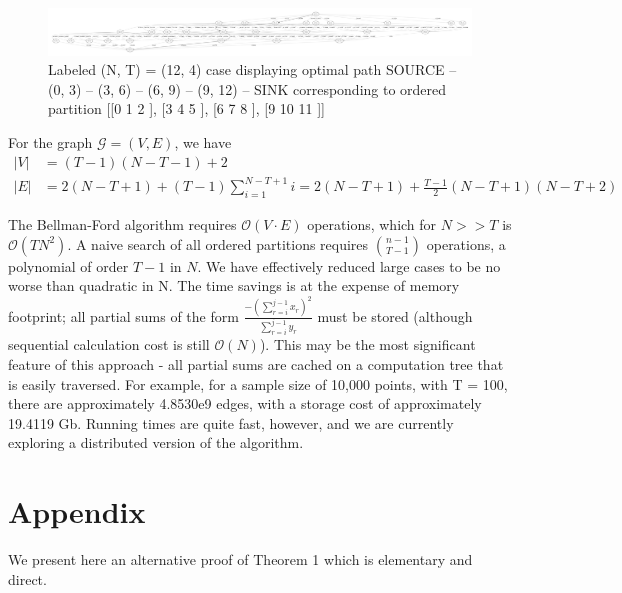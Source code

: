 \documentclass{article}
\theoremstyle{case}
\begin{document}
\vspace{16pt}
\begin{figure}
  \includegraphics[scale=.11]{12_4_labeled.pdf}
  \caption{Labeled (N, T) = (12, 4) case displaying optimal path SOURCE -- (0, 3) -- (3, 6) -- (6, 9) -- (9, 12) --  SINK corresponding to ordered partition [[0 1 2 ], [3 4 5 ], [6 7 8 ], [9 10 11 ]]}
\end{figure}

For the graph $\mathcal{G} = \left( V, E\right)$, we have 
\begin{align*}
\vert V \vert & = \left( T-1\right)\left(N-T-1\right) + 2 \\
\vert E \vert & = 2\left( N-T+1\right) + \left( T-1\right)\sum_{i=1}^{N-T+1} i = 2\left( N-T+1\right) + \frac{T-1}{2}\left( N-T+1\right)\left( N-T+2\right)
\end{align*}

The Bellman-Ford algorithm requires $\mathcal{O}\left( V\cdot E\right)$ operations, which for $N >> T$ is $\mathcal{O}\left( TN^2\right)$. A naive search of all ordered partitions requires $\binom{n-1}{T-1}$ operations, a polynomial of order $T-1$ in $N$. We have effectively reduced large cases to be no worse than quadratic in N. The time savings is at the expense of memory footprint; all partial sums of the form $\frac{-\left(\sum_{r=i}^{j-1} x_r\right)^2}{\sum_{r=i}^{j-1} y_r}$ must be stored (although sequential calculation cost is still $\mathcal{O}\left( N\right)$). This may be the most significant feature of this approach - all partial sums are cached on a computation tree that is easily traversed. For example, for a sample size of 10,000 points, with T = 100, there are approximately 4.8530e9 edges, with a storage cost of approximately 19.4119 Gb. Running times are quite fast, however, and we are currently exploring a distributed version of the algorithm.

\cleardoublepage
\appendix
\section{Appendix}
We present here an alternative proof of Theorem 1 which is elementary and direct.

\vspace{6pt}
\end{document}
